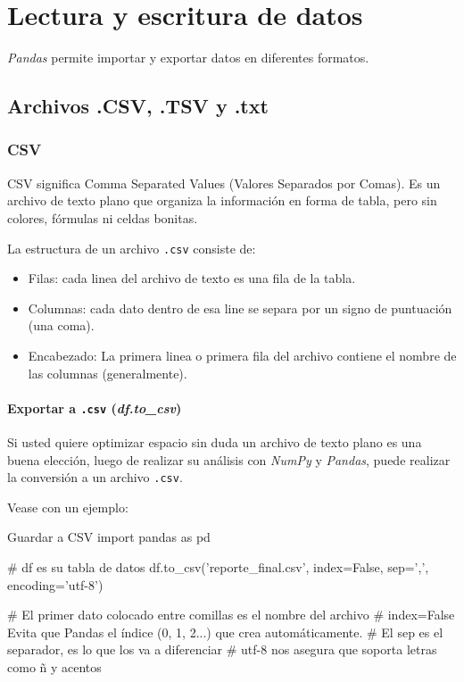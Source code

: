 \section{Lectura y escritura de datos}

\textit{Pandas} permite importar y exportar datos en diferentes formatos.

\subsection{Archivos .CSV, .TSV y .txt}

\subsubsection{CSV}
CSV significa Comma Separated Values (Valores Separados por Comas). Es un archivo de texto plano que organiza la información en forma de tabla, pero sin colores, fórmulas ni celdas bonitas. 

La estructura de un archivo \texttt{.csv} consiste de:
\begin{itemize}
    \item Filas: cada linea del archivo de texto es una fila de la tabla.
    \item Columnas: cada dato dentro de esa line se separa por un signo de puntuación (una coma).
    \item Encabezado: La primera linea o primera fila del archivo contiene el nombre de las columnas (generalmente).
\end{itemize}

\paragraph{Exportar a \texttt{.csv} (\textit{df.to\_csv})}

Si usted quiere optimizar espacio sin duda un archivo de texto plano es una buena elección, luego de realizar su análisis con \textit{NumPy} y \textit{Pandas}, puede realizar la conversión a un archivo \texttt{.csv}.

Vease con un ejemplo:
\begin{pycode}{Guardar a CSV}
import pandas as pd

# df es su tabla de datos
df.to_csv('reporte_final.csv', index=False, sep=',', encoding='utf-8')

# El primer dato colocado entre comillas es el nombre del archivo
# index=False Evita que Pandas el índice (0, 1, 2...) que crea automáticamente.
# El sep es el separador, es lo que los va a diferenciar
# utf-8 nos asegura que soporta letras como ñ y acentos
\end{pycode}


